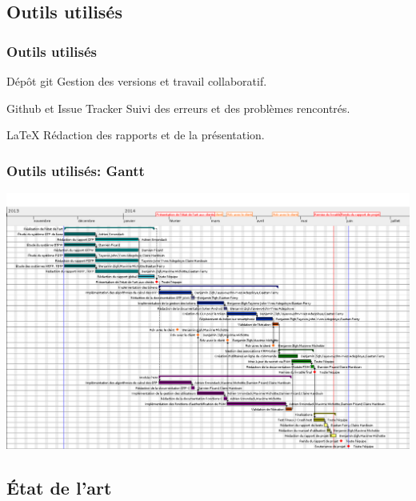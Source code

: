 \documentclass[xcolor=table]{beamer}
\begin{document}
\subsection{Outils utilisés}
\begin{frame}
\frametitle{Outils utilisés}

\begin{block}{Dépôt git}
Gestion des versions et travail collaboratif.
\end{block}

\begin{block}{Github et Issue Tracker}
Suivi des erreurs et des problèmes rencontrés.
\end{block}

\begin{block}{LaTeX}
Rédaction des rapports et de la présentation.
\end{block}

\end{frame}

\begin{frame}
\frametitle{Outils utilisés: Gantt}

\includegraphics[scale=0.25]{../graphics/gantt2-0.png}
\end{frame}

\subsection{État de l'art}
\end{document}
